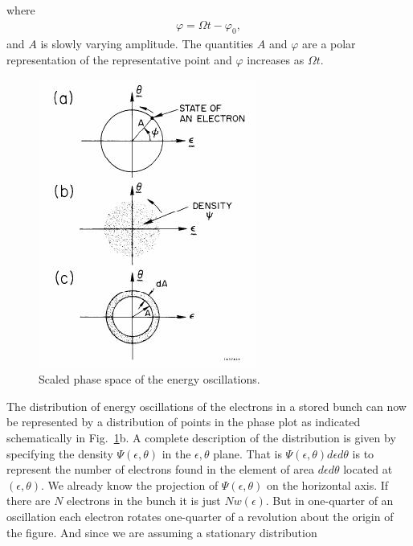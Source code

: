 where
\begin{align}
	\varphi = \Omega t - \varphi_0,
\end{align}
and $A$ is slowly varying amplitude. The quantities $A$ and $\varphi$ are a polar representation of the representative point and $\varphi$ increases as $\Omega t$.
\begin{figure}[!htb]
	\centering
	\includegraphics[width=0.8\linewidth]{./Figuras/fig44.jpeg}
	\caption{Scaled phase space of the energy oscillations.}
	\label{fig:fig44}
\end{figure}
The distribution of energy oscillations of the electrons in a stored bunch can now be represented
 by a distribution of points in the phase plot as indicated schematically in Fig.~\ref{fig:fig44}b. A complete description of the distribution is given by specifying the density $\Psi(\epsilon,\theta)$ in the $\epsilon,\theta$ plane. That is $\Psi(\epsilon,\theta) d\epsilon d\theta$ is to represent the number of electrons found in the element of area $d\epsilon d\theta$ located at $(\epsilon,\theta)$. We already know the projection of $\Psi(\epsilon,\theta)$ on the horizontal axis. If there are $N$ electrons in the bunch it is just $N w(\epsilon)$. But in one-quarter of an oscillation each electron rotates one-quarter of a revolution about the origin of the figure. And since we are assuming a stationary distribution

